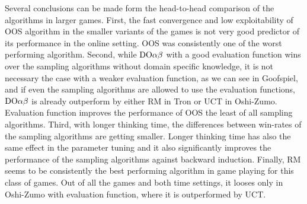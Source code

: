
Several conclusions can be made form the head-to-head comparison of the algorithms in larger games. 
First, the fast convergence and low exploitability of OOS algorithm in the smaller variants of the games is not very good predictor of its performance in the online setting. OOS was consistently one of the worst performing algorithm. 
Second, while $\textrm{DO}\alpha\beta$ with a good evaluation function wins over the sampling algorithms without domain specific knowledge, it is not necessary the case with a weaker evaluation function, as we can see in Goofspiel, and if even the sampling algorithms are allowed to use the evaluation functions, $\textrm{DO}\alpha\beta$ is already outperform by either RM in Tron or UCT in Oshi-Zumo. Evaluation function improves the performance of OOS the least of all sampling algorithms.
Third, with longer thinking time, the differences between win-rates of the sampling algorithms are getting smaller. Longer thinking time has also the same effect in the parameter tuning and it also significantly improves the performance of the sampling algorithms against backward induction.
Finally, RM seems to be consistently the best performing algorithm in game playing for this class of games. Out of all the games and both time settings, it looses only in Oshi-Zumo with evaluation function, where it is outperformed by UCT.

